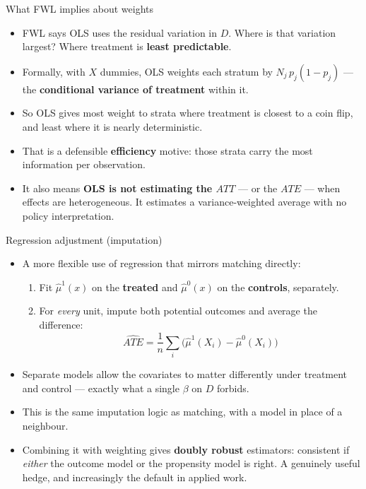\documentclass[
  11pt,
  ignorenonframetext,
  aspectratio=169,
]{beamer}
\providecommand{\tightlist}{%
  \setlength{\itemsep}{0pt}\setlength{\parskip}{0pt}}
\begin{document}
\begin{frame}{What FWL implies about weights}
\protect{}\label{what-fwl-implies-about-weights}
\begin{itemize}
\tightlist
\item
  FWL says OLS uses the residual variation in \(D\). Where is that
  variation largest? Where treatment is \textbf{least predictable}.
\item
  Formally, with \(X\) dummies, OLS weights each stratum by
  \(N_j\, p_j(1-p_j)\) --- the \textbf{conditional variance of
  treatment} within it.
\item
  So OLS gives most weight to strata where treatment is closest to a
  coin flip, and least where it is nearly deterministic.
\item
  That is a defensible \textbf{efficiency} motive: those strata carry
  the most information per observation.
\item
  It also means \textbf{OLS is not estimating the \(ATT\)} --- or the
  \(ATE\) --- when effects are heterogeneous. It estimates a
  variance-weighted average with no policy interpretation.
\end{itemize}
\end{frame}

\begin{frame}{Regression adjustment (imputation)}
\protect{}\label{regression-adjustment-imputation}
\begin{itemize}
\tightlist
\item
  A more flexible use of regression that mirrors matching directly:

  \begin{enumerate}
  \tightlist
  \item
    Fit \(\hat\mu^1(x)\) on the \textbf{treated} and \(\hat\mu^0(x)\) on
    the \textbf{controls}, separately.
  \item
    For \emph{every} unit, impute both potential outcomes and average
    the difference: \[
    \widehat{ATE} = \frac{1}{n}\sum_i \big( \hat\mu^1(X_i) - \hat\mu^0(X_i) \big)
    \]
  \end{enumerate}
\item
  Separate models allow the covariates to matter differently under
  treatment and control --- exactly what a single \(\beta\) on \(D\)
  forbids.
\item
  This is the same imputation logic as matching, with a model in place
  of a neighbour.
\item
  Combining it with weighting gives \textbf{doubly robust} estimators:
  consistent if \emph{either} the outcome model or the propensity model
  is right. A genuinely useful hedge, and increasingly the default in
  applied work.
\end{itemize}
\end{frame}
\end{document}
